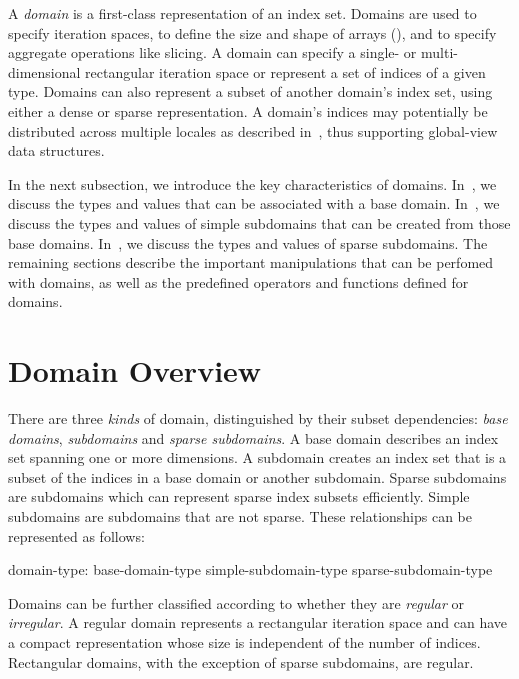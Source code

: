 \label{Domains}

A \emph{domain} is a first-class representation of an index set.
Domains are used to specify iteration spaces, to define the size and
shape of arrays (), and to specify aggregate operations
like slicing.
A domain can specify a single- or multi-dimensional
rectangular iteration space or represent a set of indices of
a given type.  Domains can also represent a subset of another domain's index set,
using either a dense or sparse representation.
A domain's
indices may potentially be distributed across multiple locales as
described in~, thus supporting global-view data
structures.

In the next subsection, we introduce the key characteristics of domains.
In~, we discuss the types and values that
can be associated with a base domain.  In~, we discuss the
types and values of simple subdomains that can be created from those base
domains.  In~, we discuss the types and values of sparse
subdomains.  The remaining sections describe the important manipulations
that can be perfomed with domains, as well as the predefined operators and
functions defined for domains.

\section{Domain Overview}

There are three \emph{kinds} of domain, distinguished by their subset
dependencies: \emph{base domains}, \emph{subdomains} and \emph{sparse
subdomains}.  A base domain describes an index set spanning one or more
dimensions.  A subdomain creates an index set that is a subset of the indices in
a base domain or another subdomain.  Sparse subdomains are subdomains which can
represent sparse index subsets efficiently.  Simple subdomains are subdomains
that are not sparse.  These relationships can be represented as follows:

\begin{syntax}
domain-type:
  base-domain-type
  simple-subdomain-type
  sparse-subdomain-type
\end{syntax}

Domains can be further classified according to whether they are \emph{regular}
or \emph{irregular}.  A regular domain represents a rectangular iteration
space and can have a compact representation whose size is independent
of the number of indices. Rectangular domains, with the exception of
sparse subdomains, are regular.

